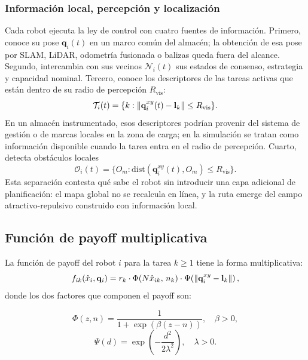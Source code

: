 \subsubsection{Información local, percepción y localización}

Cada robot ejecuta la ley de control con cuatro fuentes de información. Primero, conoce
su pose $\mathbf{q}_i(t)$ en un marco común del almacén; la obtención de esa pose por
SLAM, LiDAR, odometría fusionada o balizas queda fuera del alcance. Segundo, intercambia
con sus vecinos $\mathcal{N}_i(t)$ sus estados de consenso, estrategia y capacidad
nominal. Tercero, conoce los descriptores de las tareas activas que están dentro de su
radio de percepción $R_{\mathrm{vis}}$:
\[
  \mathcal{T}_i(t)=
  \{k:\left\|\mathbf{q}_i^{xy}(t)-\mathbf{l}_k\right\|\leq R_{\mathrm{vis}}\}.
\]
En un almacén instrumentado, esos descriptores podrían provenir del sistema de gestión
o de marcas locales en la zona de carga; en la simulación se tratan como información
disponible cuando la tarea entra en el radio de percepción. Cuarto, detecta obstáculos
locales
\[
  \mathcal{O}_i(t)=
  \{O_m:\mathrm{dist}(\mathbf{q}_i^{xy}(t),O_m)\leq R_{\mathrm{vis}}\}.
\]
Esta separación contesta qué sabe el robot sin introducir una capa adicional de
planificación: el mapa global no se recalcula en línea, y la ruta emerge del campo
atractivo-repulsivo construido con información local.

\subsection{Función de payoff multiplicativa}

La función de payoff del robot $i$ para la tarea $k \geq 1$ tiene la forma
multiplicativa:
\begin{equation}
  f_{ik}(\hat{x}_i, \mathbf{q}_i) = r_k \cdot \Phi\!\left(N\hat{x}_{ik},\, n_k\right)
    \cdot \Psi\!\left(\left\|\mathbf{q}_i^{xy} - \mathbf{l}_k\right\|\right),
  \label{eq:payoff}
\end{equation}
donde los dos factores que componen el payoff son:

\begin{equation}
  \Phi(z, n) = \frac{1}{1 + \exp\!\left(\beta(z - n)\right)},
  \quad \beta > 0,
  \label{eq:sigmoid}
\end{equation}
\begin{equation}
  \Psi(d) = \exp\!\left(-\frac{d^2}{2\lambda^2}\right),
  \quad \lambda > 0.
  \label{eq:gaussian}
\end{equation}

